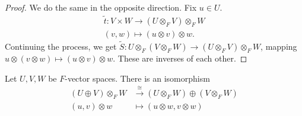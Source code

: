 \documentclass[10pt]{mypackage}
\begin{document}
\begin{proof}
    We do the same in the opposite direction. Fix $u\in U$.
    \begin{align*}
      \tilde{t}: V\times W \rightarrow \left(U\otimes_{F}V\right)\otimes_{F}W\\
      \left(v,w\right) \mapsto \left(u\otimes v\right)\otimes w.
    \end{align*}
    Continuing the process, we get $\tilde{S}: U\otimes_{F} \left(V\otimes_{F} W\right)\rightarrow \left(U\otimes_{F} V\right)\otimes_{F} W$, mapping $u\otimes \left(v\otimes w\right)\mapsto \left(u\otimes v\right)\otimes w$. These are inverses of each other.
  \end{proof}
  \begin{theorem}
    Let $U,V,W$ be $F$-vector spaces. There is an isomorphism
    \begin{align*}
      \left(U\oplus V\right)\otimes_{F} W &\xrightarrow{\cong} \left(U\otimes_{F}W\right)\oplus \left(V\otimes_{F}W\right)\\
      \left(u,v\right)\otimes w &\mapsto \left(u\otimes w,v\otimes w\right)
    \end{align*}
  \end{theorem}
\end{document}
